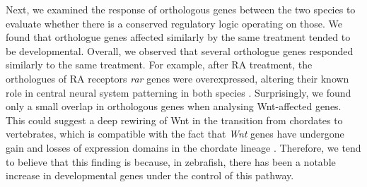 Next, we examined the response of orthologous genes between the two species to evaluate whether there is a conserved regulatory logic operating on those. We found that orthologue genes affected similarly by the same treatment tended to be developmental. Overall, we observed that several orthologue genes responded similarly to the same treatment. For example, after RA treatment, the orthologues of RA receptors \textit{rar} genes were overexpressed, altering their known role in central neural system patterning in both species \parencite{bertrand_developmental_2017, kiecker_molecular_2016}. Surprisingly, we found only a small overlap in orthologous genes when analysing Wnt-affected genes. This could suggest a deep rewiring of Wnt in the transition from chordates to vertebrates, which is compatible with the fact that \textit{Wnt} genes have undergone gain and losses of expression domains in the chordate lineage \parencite{somorjai_wnt_2018}. Therefore, we tend to believe that this finding is because, in zebrafish, there has been a notable increase in developmental genes under the control of this pathway.

